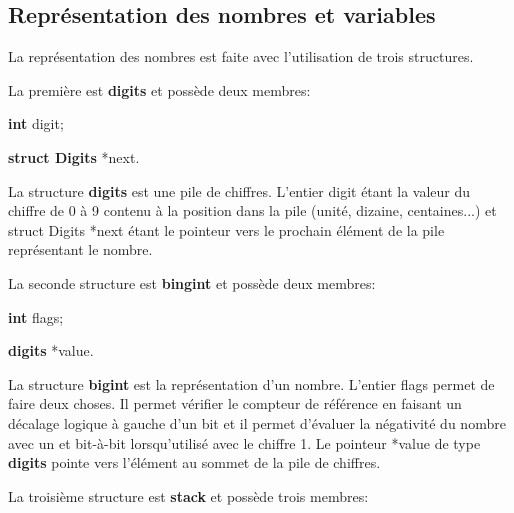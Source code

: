 \documentclass[]{report}
\begin{document}
	\begin{normalsize}
		\section*{\LARGE Représentation des nombres et variables}\vspace{4mm}
		La représentation des nombres est faite avec l'utilisation de trois structures.\vspace{4mm}
		\par La première est \textbf{digits} et possède deux membres: 
		\begin{description}[noitemsep]
			\item \hspace{4mm}\textbf{int} digit;
			\item \hspace{4mm}\textbf{struct Digits} *next.
		\end{description}
	\par La structure \textbf{digits} est une pile de chiffres. L'entier digit étant la valeur du chiffre de 0 à 9 contenu à la position dans la pile (unité, dizaine, centaines...) et struct Digits *next étant le pointeur vers le prochain élément de la pile représentant le nombre.\vspace{4mm}
	
	\par La seconde structure est \textbf{bingint} et possède deux membres:
		
		\begin{description}[noitemsep]
			\item \hspace{4mm}\textbf{int} flags;
			\item \hspace{4mm}\textbf{digits} *value.
		\end{description}
		\par La structure \textbf{bigint} est la représentation d'un nombre. L'entier flags permet de faire deux choses. Il permet vérifier le compteur de référence en faisant un décalage logique à gauche d'un bit et il permet d'évaluer la négativité du nombre avec un et bit-à-bit lorsqu'utilisé avec le chiffre 1. Le pointeur *value de type \textbf{digits} pointe vers l'élément au sommet de la pile de chiffres.\vspace{4mm}
	
	\par La troisième structure est \textbf{stack} et possède trois membres:
	

\end{normalsize}
\end{document}

